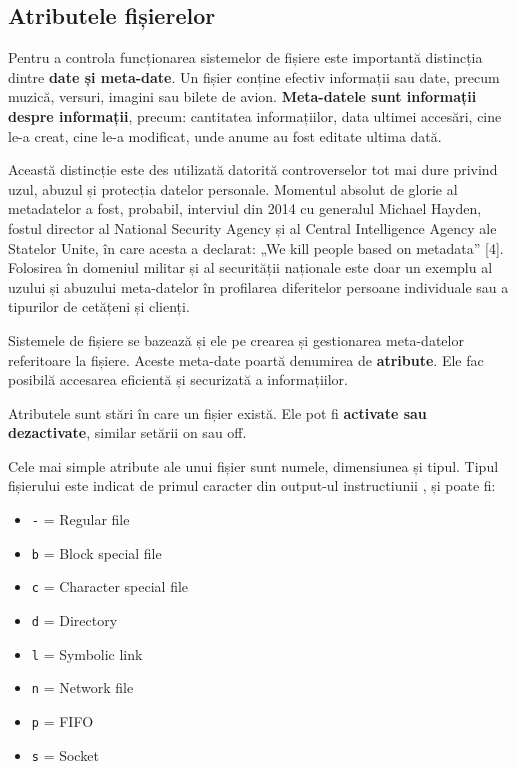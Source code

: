 
\subsection{Atributele fișierelor}
\label{sec:file-system-file-attributes}

Pentru a controla funcționarea sistemelor de fișiere este importantă distincția
dintre \textbf{date și meta-date}. Un fișier conține efectiv informații sau
date, precum muzică, versuri, imagini sau bilete de avion. \textbf{Meta-datele
sunt informații despre informații}, precum: cantitatea informațiilor, data
ultimei accesări, cine le-a creat, cine le-a modificat, unde anume au fost
editate ultima dată.

Această distincție este des utilizată datorită controverselor tot mai dure
privind uzul, abuzul și protecția datelor personale. Momentul absolut de glorie
al metadatelor a fost, probabil, interviul din 2014 cu generalul Michael Hayden,
fostul director al National Security Agency și al Central Intelligence Agency
ale Statelor Unite, în care acesta a declarat: „We kill people based on
metadata” [4]. Folosirea în domeniul militar și al securității naționale este
doar un exemplu al uzului și abuzului meta-datelor în profilarea diferitelor
persoane individuale sau a tipurilor de cetățeni și clienți.

Sistemele de fișiere se bazează și ele pe crearea și gestionarea meta-datelor referitoare la
fișiere. Aceste meta-date poartă denumirea de \textbf{atribute}. Ele fac posibilă accesarea
eficientă și securizată a informațiilor.

Atributele sunt stări în care un fișier există. Ele pot fi \textbf{activate sau
dezactivate}, similar setării on sau off.

Cele mai simple atribute ale unui fișier sunt numele, dimensiunea și tipul.
Tipul fișierului este indicat de primul caracter din output-ul instructiunii
, și poate fi:


\begin{itemize}
	\item \texttt{-} = Regular file
	\item \texttt{b} = Block special file
	\item \texttt{c} = Character special file
	\item \texttt{d} = Directory
	\item \texttt{l} = Symbolic link
	\item \texttt{n} = Network file
	\item \texttt{p} = FIFO
	\item \texttt{s} = Socket
\end{itemize}


